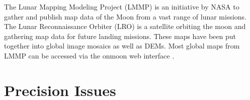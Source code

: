 The Lunar Mapping Modeling Project (LMMP) is an initiative by NASA to gather and publish map data of the Moon from a vast range of lunar missions. The Lunar Reconnaissance Orbiter (LRO) is a satellite orbiting the moon and gathering map data for future landing missions. These maps have been put together into global image mosaics as well as DEMs. Most global maps from LMMP can be accessed via the onmoon web interface \cite{onmoon}.

\section{Precision Issues}




